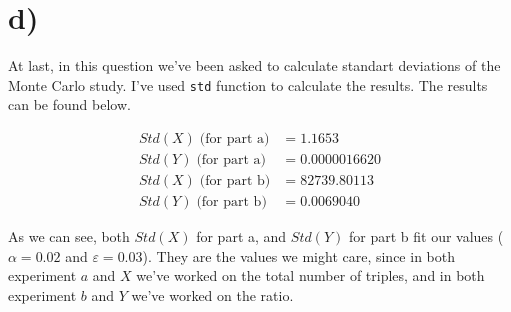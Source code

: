 \documentclass[12pt]{article}
\begin{document}
\section*{d)}
    At last, in this question we've been asked to calculate standart deviations of the Monte Carlo study. I've used \texttt{std} function to calculate the results. The results can be found below.
    
    \begin{align*}
        Std(X) \; \text{(for part a)} &=  1.1653 \\
        Std(Y) \; \text{(for part a)} &=  0.0000016620 \\
        Std(X) \; \text{(for part b)} &=  82739.80113 \\
        Std(Y) \; \text{(for part b)} &=  0.0069040
    \end{align*}
    
    As we can see, both $Std(X)$ for part a, and $Std(Y)$ for part b fit our values ($\alpha = 0.02$ and $\varepsilon = 0.03$). They are the values we might care, since in both experiment $a$ and $X$ we've worked on the total number of triples, and in both experiment $b$ and $Y$ we've worked on the ratio.
\end{document}
